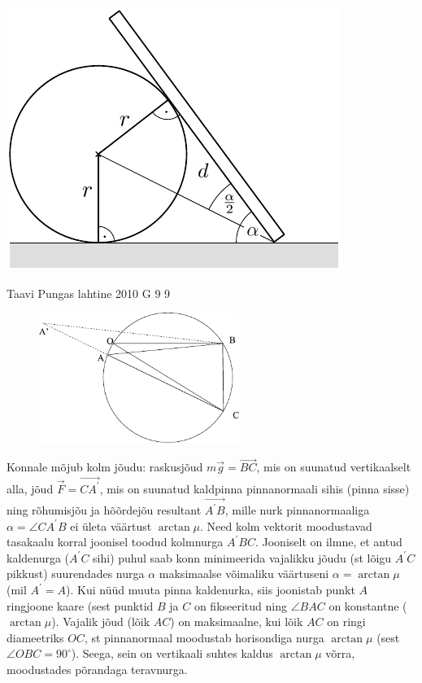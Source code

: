 \documentclass[11pt]{article}
\begin{document}
{{\begin{center}
	\includegraphics[width=0.7\linewidth]{2008-v3g-09-lah2}
\end{center}
\fi
}

{Taavi Pungas} %
{lahtine} %
{2010} %
{G 9} %
{9} %
{

\ifSolution
\begin{figure}
	\vspace{-4ex}
	\includegraphics[width=65mm]{2010-lahg-09-lah}
	\vspace{-6ex}
\end{figure}
Konnale mõjub kolm jõudu: raskusjõud $m\vec g = \vec {BC}$, mis on suunatud vertikaalselt alla, jõud $\vec F =\vec {CA^\prime}$, 
mis on suunatud kaldpinna pinnanormaali sihis (pinna sisse)
ning rõhumisjõu ja hõõrdejõu resultant $\vec {A^\prime B}$, mille nurk pinnanormaaliga $\alpha=\angle CA^\prime B$ ei ületa väärtust 
$\arctan \mu$. Need kolm vektorit moodustavad tasakaalu korral
joonisel toodud kolmnurga $A^\prime BC$. Jooniselt on ilmne, et antud kaldenurga 
($A^\prime C$ sihi) puhul saab konn minimeerida vajalikku jõudu (st lõigu $A^\prime C$ pikkust) 
suurendades nurga $\alpha$ maksimaalse võimaliku väärtuseni $\alpha = \arctan \mu$ (mil $A^\prime = A$). Kui nüüd muuta pinna kaldenurka, 
siis joonistab punkt $A$ ringjoone kaare (sest punktid $B$ ja $C$ on fikseeritud ning $\angle BAC$ on konstantne ($\arctan \mu$). 
Vajalik jõud (lõik $AC$) on maksimaalne, kui lõik $AC$ on ringi diameetriks $OC$, st pinnanormaal moodustab horisondiga 
nurga $\arctan\mu$ (sest $\angle OBC=90^\circ$). Seega, sein on vertikaali suhtes kaldus $\arctan \mu$ võrra, moodustades põrandaga teravnurga.

}}
\end{document}
